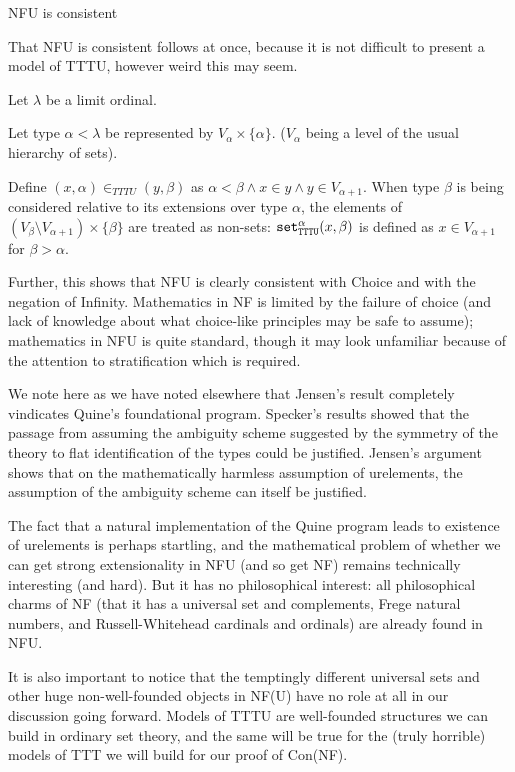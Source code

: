 \documentclass{slides}
\begin{document}
\begin{slide}

{\Large NFU is consistent}

That NFU is consistent follows at once, because it is not difficult to present a model of TTTU, however weird this may seem.

Let $\lambda$ be a limit ordinal.

Let type $\alpha<\lambda$ be represented by $V_{\alpha} \times \{\alpha\}$. ($V_\alpha$ being a level of the usual hierarchy of sets).

Define $(x,\alpha) \in_{TTTU} (y,\beta)$ as $\alpha<\beta \wedge x \in y \wedge y \in V_{\alpha+1}$.    When type
$\beta$ is being considered relative to its extensions over type $\alpha$, the elements of $(V_{\beta} \setminus V_{\alpha+1})\times \{\beta\}$ are treated as non-sets:  ${\tt set}^{\alpha}_{\tt TTTU}(x,\beta)$ is defined as $x \in V_{\alpha+1}$ for $\beta>\alpha$.

Further, this shows that NFU is clearly consistent with Choice and with the negation of Infinity.  Mathematics in NF is limited by the failure of choice (and lack of knowledge about what choice-like principles may be safe to assume);  mathematics in NFU is quite standard, though it may look unfamiliar because of the attention to stratification which is required.

\end{slide}

\begin{slide}


We note here as we have noted elsewhere that Jensen's result completely vindicates Quine's foundational program.   Specker's results showed that the passage from assuming the ambiguity scheme suggested by the symmetry of the theory to flat identification of the types could be justified.  Jensen's argument shows that on the mathematically harmless assumption of urelements, the assumption of the ambiguity scheme can itself be justified.

The fact that a natural implementation of the Quine program leads to existence of urelements is perhaps startling, and the mathematical problem of whether we can get strong extensionality in NFU (and so get NF) remains technically interesting (and hard).  But it has no philosophical interest: all philosophical charms of NF (that it has a universal set and complements, Frege natural numbers, and Russell-Whitehead cardinals and ordinals) are already found in NFU.

It is also important to notice that the temptingly different universal sets and other huge non-well-founded objects in NF(U) have no role at all in our discussion going forward.  Models of TTTU are well-founded structures we can build in ordinary set theory, and the same will be true for the (truly horrible) models of TTT we will build for our proof of Con(NF).

\end{slide}
\end{document}
